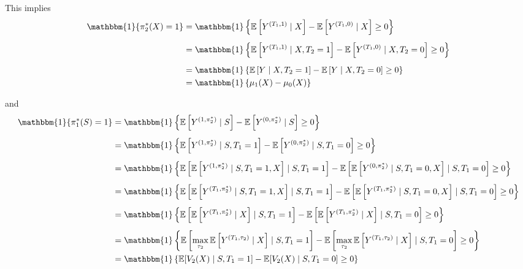 \documentclass[12pt]{article}
\newcommand{\1}{\mathbf{1}}
\begin{document}
\begin{appendix}
This implies
\begin{align*}
\mathbbm{1}\{\pi^*_2(X)=1\}
&=
\mathbbm{1}\left\{
\mathbb{E}\left[Y^{(T_1,1)} \mid X\right]
-
\mathbb{E}\left[Y^{(T_1,0)} \mid X\right]
\geq 0
\right\} \\[0.5em]
&=
\mathbbm{1}\left\{
\mathbb{E}\left[Y^{(T_1,1)} \mid X,T_2=1\right]
-
\mathbb{E}\left[Y^{(T_1,0)} \mid X,T_2=0\right]
\geq 0
\right\} \\[0.5em]
&=
\mathbbm{1}\left\{
\mathbb{E}\left[Y \mid X,T_2=1\right]
-
\mathbb{E}\left[Y \mid X,T_2=0\right]
\geq 0
\right\}\\
&= 
\mathbbm{1}\left\{
\mu_1(X) - \mu_0(X)
\right\}
\end{align*}

and
\begin{align*}
\mathbbm{1}\{\pi^*_1(S)=1\}
&=
\mathbbm{1}\left\{
\mathbb{E}\left[ Y^{(1,\pi_2^*)} \mid S \right]
-
\mathbb{E}\left[ Y^{(0,\pi_2^*)} \mid S \right]
\geq 0
\right\} \\[0.5em]
&=
\mathbbm{1}\left\{
\mathbb{E}\left[ Y^{(1,\pi_2^*)} \mid S,T_1=1 \right]
-
\mathbb{E}\left[ Y^{(0,\pi_2^*)} \mid S,T_1=0 \right]
\geq 0
\right\} \\[0.5em]
&=
\mathbbm{1}\left\{
\mathbb{E}\left[
\mathbb{E}\left[ Y^{(1,\pi_2^*)} \mid S,T_1=1,X \right]
\mid S,T_1=1
\right]
-
\mathbb{E}\left[
\mathbb{E}\left[ Y^{(0,\pi_2^*)} \mid S,T_1=0,X \right]
\mid S,T_1=0
\right]
\geq 0
\right\} \\[0.5em]
&=
\mathbbm{1}\left\{
\mathbb{E}\left[
\mathbb{E}\left[ Y^{(T_1,\pi_2^*)} \mid S,T_1=1,X \right]
\mid S,T_1=1
\right]
-
\mathbb{E}\left[
\mathbb{E}\left[ Y^{(T_1,\pi_2^*)} \mid S,T_1=0,X \right]
\mid S,T_1=0
\right]
\geq 0
\right\} \\[0.5em]
&=
\mathbbm{1}\left\{
\mathbb{E}\left[
\mathbb{E}\left[ Y^{(T_1,\pi_2^*)} \mid X \right]
\mid S,T_1=1
\right]
-
\mathbb{E}\left[
\mathbb{E}\left[ Y^{(T_1,\pi_2^*)} \mid X \right]
\mid S,T_1=0
\right]
\geq 0
\right\} \\[0.5em]
&=
\mathbbm{1}\left\{
\mathbb{E}\left[
\max_{\tau_2}
\mathbb{E}\left[ Y^{(T_1,\tau_2)} \mid X \right]
\mid S,T_1=1
\right]
-
\mathbb{E}\left[
\max_{\tau_2}
\mathbb{E}\left[ Y^{(T_1,\tau_2)} \mid X \right]
\mid S,T_1=0
\right]
\geq 0
\right\}\\
&= 
\mathbbm{1}\left\{
\mathbb{E}[V_2(X) \mid S, T_1 = 1] - \mathbb{E}[V_2(X) \mid S, T_1 = 0] \geq 0
\right\}
\end{align*}

    
\end{appendix}
\end{document}
